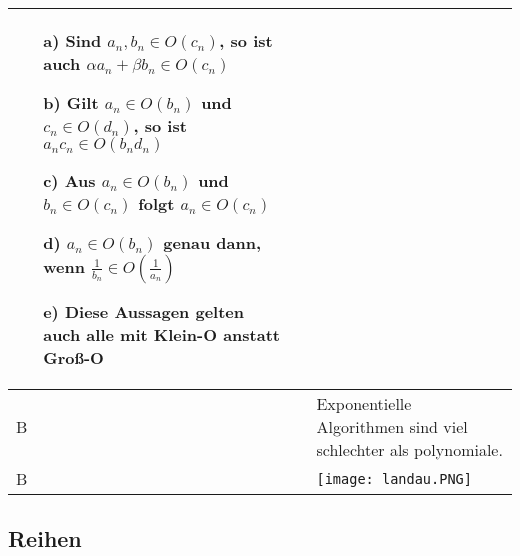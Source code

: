 \begin{longtable}{p{0.75cm} p{1cm} p{16cm}}
                            \begin{itemize}[topsep=-0.5cm]
                                \item[a)] Sind $a_n, b_n \in O(c_n)$, so ist auch $\alpha a_n + \beta b_n \in O(c_n)$
                                \item[b)] Gilt $a_n \in O(b_n)$ und $c_n \in O(d_n)$, so ist $a_n c_n \in O(b_n d_n)$
                                \item[c)] Aus $a_n \in O(b_n)$ und $b_n \in O(c_n)$ folgt $a_n \in O(c_n)$
                                \item[d)] $a_n \in O(b_n)$ genau dann, wenn $\frac{1}{b_n} \in O(\frac{1}{a_n})$
                                \item[e)] Diese Aussagen gelten auch alle mit Klein-O anstatt Gro\ss-O 
                            \end{itemize} \vspace{-0cm} \\
        \midrule
        B   &       &   Exponentielle Algorithmen sind viel schlechter als polynomiale. \\
        \midrule
        B   &       &   \texttt{[image: landau.PNG]} \\
        \bottomrule
        
    \end{longtable}

\pagebreak

\subsection{Reihen}

